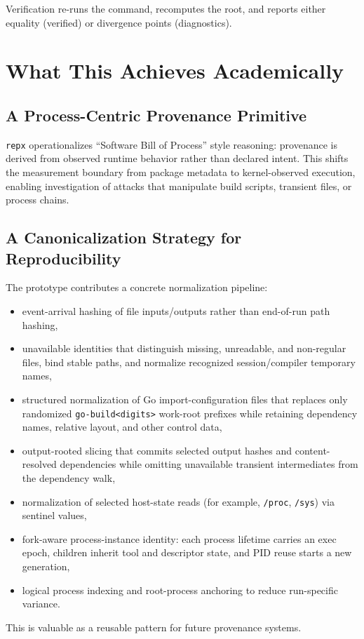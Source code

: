 \documentclass[11pt]{article}
\begin{document}
Verification re-runs the command, recomputes the root, and reports either equality (verified) or divergence points (diagnostics).

\section{What This Achieves Academically}
\subsection{A Process-Centric Provenance Primitive}
\texttt{repx} operationalizes ``Software Bill of Process'' style reasoning: provenance is derived from observed runtime behavior rather than declared intent. This shifts the measurement boundary from package metadata to kernel-observed execution, enabling investigation of attacks that manipulate build scripts, transient files, or process chains.

\subsection{A Canonicalization Strategy for Reproducibility}
The prototype contributes a concrete normalization pipeline:
\begin{itemize}
  \item event-arrival hashing of file inputs/outputs rather than end-of-run path hashing,
  \item unavailable identities that distinguish missing, unreadable, and non-regular files, bind stable paths, and normalize recognized session/compiler temporary names,
  \item structured normalization of Go import-configuration files that replaces only randomized \texttt{go-build<digits>} work-root prefixes while retaining dependency names, relative layout, and other control data,
  \item output-rooted slicing that commits selected output hashes and content-resolved dependencies while omitting unavailable transient intermediates from the dependency walk,
  \item normalization of selected host-state reads (for example, \texttt{/proc}, \texttt{/sys}) via sentinel values,
  \item fork-aware process-instance identity: each process lifetime carries an exec epoch, children inherit tool and descriptor state, and PID reuse starts a new generation,
  \item logical process indexing and root-process anchoring to reduce run-specific variance.
\end{itemize}
This is valuable as a reusable pattern for future provenance systems.
\end{document}
